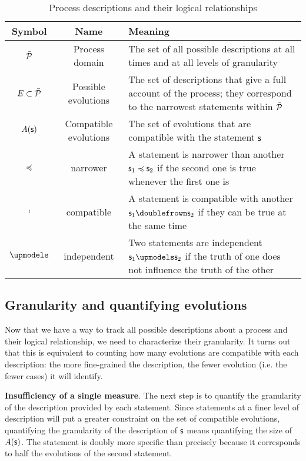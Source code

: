 \documentclass[10pt, onecolumn, longbibliography, nofootinbib]{revtex4-2}
\begin{document}
\begin{table}[h!]
	\centering
	\begin{tabular}{|c|c|p{6cm}|}
		\hline 
		Symbol & Name & Meaning \\ 
		\hline 
		$\tdomain[P]$ & Process domain & The set of all possible descriptions at all times and at all levels of granularity \\ 
		\hline 
		$E \subset \tdomain[P]$ & Possible evolutions & The set of descriptions that give a full account of the process; they correspond to the narrowest statements within $\tdomain[P]$ \\ 
		\hline 
		$A(\stmt)$ & Compatible evolutions & The set of evolutions that are compatible with the statement $\stmt$ \\ 
		\hline 
		$\narrower$ & narrower & A statement is narrower than another $\stmt_1 \narrower \stmt_2$ if the second one is true whenever the first one is \\ 
		\hline 
		$\comp$ & compatible & A statement is compatible with another $\stmt_1 \comp \stmt_2$ if they can be true at the same time \\ 
		\hline 
		$\indep$ & independent & Two statements are independent  $\stmt_1 \indep \stmt_2$ if the truth of one does not influence the truth of the other \\ 
		\hline 
	\end{tabular}
	\caption{Process descriptions and their logical relationships}
	\label{table:logic}
\end{table}

\subsection{Granularity and quantifying evolutions}

Now that we have a way to track all possible descriptions about a process and their logical relationship, we need to characterize their granularity. It turns out that this is equivalent to counting how many evolutions are compatible with each description: the more fine-grained the description, the fewer evolution (i.e. the fewer cases) it will identify.

\textbf{Insufficiency of a single measure}. The next step is to quantify the granularity of the description provided by each statement. Since statements at a finer level of description will put a greater constraint on the set of compatible evolutions, quantifying the granularity of the description of $\stmt$ means quantifying the size of $A(\stmt)$. The statement  is doubly more specific than  precisely because it corresponds to half the evolutions of the second statement.
\end{document}
